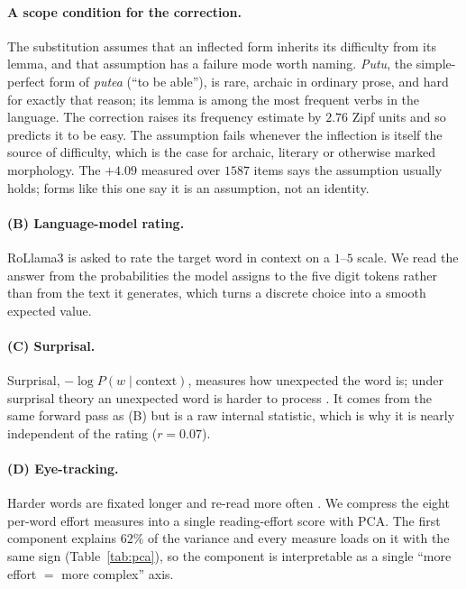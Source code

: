 \paragraph{A scope condition for the correction.}
\label{sec:scope}
The substitution assumes that an inflected form inherits its difficulty
from its lemma, and that assumption has a failure mode worth naming.
\emph{Putu}, the simple-perfect form of \emph{putea} (``to be able''), is
rare, archaic in ordinary prose, and hard for exactly that reason; its
lemma is among the most frequent verbs in the language. The correction
raises its frequency estimate by $2.76$ Zipf units and so predicts it to
be easy. The assumption fails whenever the inflection is itself the
source of difficulty, which is the case for archaic, literary or
otherwise marked morphology. The $+4.09$ measured over $1587$ items says
the assumption usually holds; forms like this one say it is an
assumption, not an identity.

\paragraph{(B) Language-model rating.}
RoLlama3 is asked to rate the target word in context on a $1$--$5$
scale. We read the answer from the probabilities the model assigns to
the five digit tokens rather than from the text it generates, which
turns a discrete choice into a smooth expected value.

\paragraph{(C) Surprisal.}
Surprisal, $-\log P(w \mid \mathrm{context})$, measures how unexpected
the word is; under surprisal theory an unexpected word is harder to
process \citep{hale2001probabilistic}. It comes from the same forward
pass as (B) but is a raw internal statistic, which is why it is nearly
independent of the rating ($r = 0.07$).

\paragraph{(D) Eye-tracking.}
Harder words are fixated longer and re-read more often
\citep{rayner1998eye}. We compress the eight per-word effort measures
into a single reading-effort score with PCA. The first component
explains $62\%$ of the variance and every measure loads on it with the
same sign (Table~\ref{tab:pca}), so the component is interpretable as a
single ``more effort $=$ more complex'' axis.

